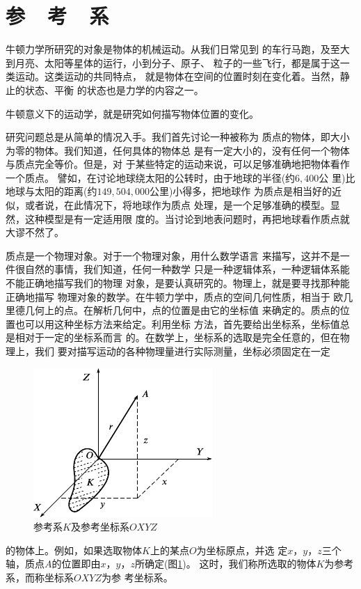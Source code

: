 \section[参考系]{参~~考~~系}\label{sec:01.04}

牛顿力学所研究的对象是物体的机械运动。从我们日常见到
的车行马跑，及至大到月亮、太阳等星体的运行，小到分子、原子、
粒子的一些飞行，都是属于这一类运动。这类运动的共同特点，
就是物体在空间的位置时刻在变化着。当然，静止的状态、平衡
的状态也是力学的内容之一。

牛顿意义下的运动学，就是研究如何描写物体位置的变化。

研究问题总是从简单的情况入手。我们首先讨论一种被称为
质点的物体，即大小为零的物体。我们知道，任何具体的物体总
是有一定大小的，没有任何一个物体与质点完全等价。但是，对
于某些特定的运动来说，可以足够准确地把物体看作一个质点。
譬如，在讨论地球绕太阳的公转时，由于地球的半径(约$ 6,400 $公
里)比地球与太阳的距离(约$ 149,504,000 $公里)小得多，把地球作
为质点是相当好的近似，或者说，在此情况下，将地球作为质点
处理，是一个足够准确的模型。显然，这种模型是有一定适用限
度的。当讨论到地表问题时，再把地球看作质点就大谬不然了。

质点是一个物理对象。对于一个物理对象，用什么数学语言
来描写，这并不是一件很自然的事情，我们知道，任何一种数学
只是一种逻辑体系，一种逻辑体系能不能正确地描写我们的物理
对象，是要认真研究的。物理上，就是要寻找那种能正确地描写
物理对象的数学。在牛顿力学中，质点的空间几何性质，相当于
欧几里德几何上的点。在解析几何中，点的位置是由它的坐标值
来确定的。质点的位置也可以用这种坐标方法来给定。利用坐标
方法，首先要给出坐标系，坐标值总是相对于一定的坐标系而言
的。在数学上，坐标系的选取是完全任意的，但在物理上，我们
要对描写运动的各种物理量进行实际测量，坐标必须固定在一定
\begin{figure}
  \includegraphics{figure/fig01.04}
  \caption{参考系$K$及参考坐标系$OXYZ$}
  \label{fig:01.04}
\end{figure}
的物体上。例如，如果选取物体$K$上的某点$O$为坐标原点，并选
定$x$，$y$，$z$三个轴，质点$A$的位置即由$x$，$y$，$z$所确定(图\ref{fig:01.04})。
这时，我们称所选取的物体$K$为参考系，而称坐标系$OXYZ$为参
考坐标系。

